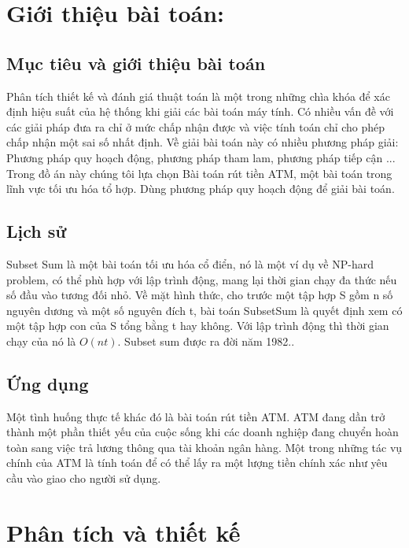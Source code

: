 \documentclass{article}
\begin{document}


\tableofcontents{}
\newpage
\section{Giới thiệu bài toán: }
\subsection{Mục tiêu và giới thiệu bài toán}
Phân tích thiết kế và đánh giá thuật toán là một trong những chìa khóa để xác định hiệu suất của hệ thống khi giải các bài toán máy tính. Có nhiều vấn đề với các giải pháp đưa ra chỉ ở mức chấp nhận được và việc tính toán chỉ cho phép chấp nhận một sai số nhất định.
Về giải bài toán này có nhiều phương pháp giải: Phương pháp quy hoạch động, phương pháp tham lam, phương pháp tiếp cận ...
Trong đồ án này chúng tôi lựa chọn Bài toán rút tiền ATM, một bài toán trong lĩnh vực tối ưu hóa tổ hợp. Dùng phương pháp quy hoạch động để giải bài toán.
\subsection{Lịch sử}
Subset Sum là một bài toán tối ưu hóa cổ điển, nó là  một ví dụ về NP-hard problem, có thể phù hợp với lập trình động, mang lại thời gian chạy đa thức nếu số đầu vào tương đối nhỏ. Về mặt hình thức, cho trước một tập hợp S gồm n số nguyên dương và một số nguyên đích t, bài toán SubsetSum là quyết định xem có một tập hợp con của S tổng bằng t hay không. Với lập trình động thì thời gian chạy của nó là $O(nt)$. Subset sum được ra đời năm 1982..
\subsection{Ứng dụng}
Một tình huống thực tế khác đó là bài toán rút tiền ATM. ATM đang dần trở thành một phần thiết yếu của cuộc sống khi các doanh nghiệp đang chuyển hoàn toàn sang việc trả lương thông qua tài khoản ngân hàng. Một trong những tác vụ chính của ATM là tính toán để có thể lấy ra một lượng tiền chính xác như yêu cầu vào giao cho người sử dụng.
\section{Phân tích và thiết kế }
\end{document}
